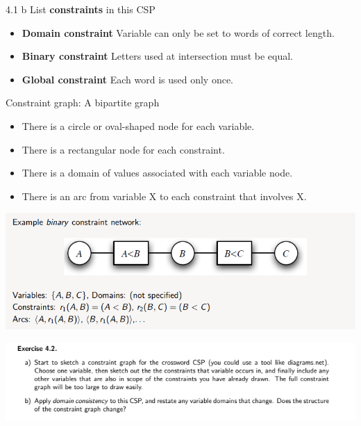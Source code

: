 \documentclass[11pt]{beamer}
\begin{document}
\begin{frame}{4.1 b}
List \textbf{constraints} in this CSP \pause
\begin{itemize}
	\item \textbf{Domain constraint} Variable can only be set to words of correct length.
	\pause
	\item \textbf{Binary constraint} Letters used at intersection must be equal.\pause
	\item \textbf{Global constraint} Each word is used only once.
\end{itemize}
\end{frame}

\begin{frame}{Constraint graph: A bipartite graph}
\pause
\begin{itemize}
	\item There is a circle or oval-shaped node for each variable.
	\pause
	\item There is a rectangular node for each constraint.\pause
	\item There is a domain of values associated with each variable node.\pause
	\item There is an arc from variable X to each constraint that involves X.\pause
\end{itemize}
\includegraphics[scale=0.4]{images/graphexample.png}
\end{frame}

\begin{frame}{4.2}
\includegraphics[scale=0.5]{images/42.png}
\end{frame}
\end{document}
